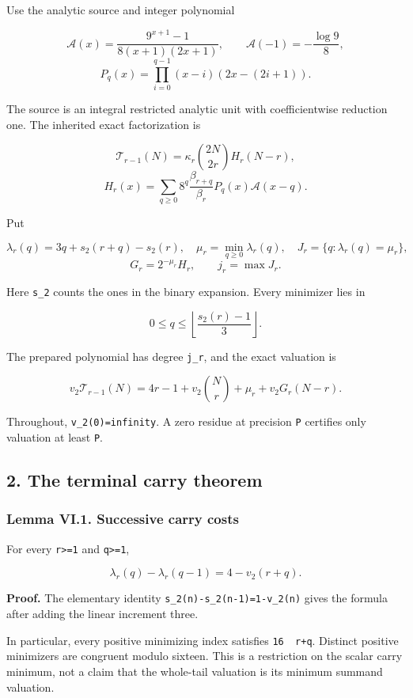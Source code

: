 \documentclass[11pt,letterpaper]{article}
\begin{document}
Use the analytic source and integer polynomial

\[
\mathscr A(x)=\frac{9^{x+1}-1}{8(x+1)(2x+1)},\qquad
\mathscr A(-1)=-\frac{\log9}{8},
\] \[
P_q(x)=\prod_{i=0}^{q-1}(x-i)(2x-(2i+1)).
\]

The source is an integral restricted analytic unit with coefficientwise reduction one. The inherited exact factorization is

\[
\mathcal T_{r-1}(N)=\kappa_r\binom{2N}{2r}H_r(N-r),
\] \[
H_r(x)=\sum_{q\ge0}8^q\frac{\beta_{r+q}}{\beta_r}P_q(x)\mathscr A(x-q).
\]

Put

\[
\lambda_r(q)=3q+s_2(r+q)-s_2(r),
\quad \mu_r=\min_{q\ge0}\lambda_r(q),
\quad J_r=\{q:\lambda_r(q)=\mu_r\},
\] \[
G_r=2^{-\mu_r}H_r,\qquad j_r=\max J_r.
\]

Here \texttt{s\_2} counts the ones in the binary expansion. Every minimizer lies in

\[
0\le q\le\left\lfloor\frac{s_2(r)-1}{3}\right\rfloor.
\]

The prepared polynomial has degree \texttt{j\_r}, and the exact valuation is

\[
\boxed{
 v_2\mathcal T_{r-1}(N)
 =4r-1+v_2\binom Nr+\mu_r+v_2G_r(N-r).
} \tag{VI.3}
\]

Throughout, \texttt{v\_2(0)=infinity}. A zero residue at precision \texttt{P} certifies only valuation at least \texttt{P}.

\subsection{2. The terminal carry theorem}\label{the-terminal-carry-theorem}

\subsubsection{Lemma VI.1. Successive carry costs}\label{lemma-vi.1.-successive-carry-costs}

For every \texttt{r\textgreater{}=1} and \texttt{q\textgreater{}=1},

\[
\boxed{\lambda_r(q)-\lambda_r(q-1)=4-v_2(r+q).} \tag{VI.4}
\]

\textbf{Proof.} The elementary identity \texttt{s\_2(n)-s\_2(n-1)=1-v\_2(n)} gives the formula after adding the linear increment three.

In particular, every positive minimizing index satisfies \texttt{16\ \textbar{}\ r+q}. Distinct positive minimizers are congruent modulo sixteen. This is a restriction on the scalar carry minimum, not a claim that the whole-tail valuation is its minimum summand valuation.
\end{document}
